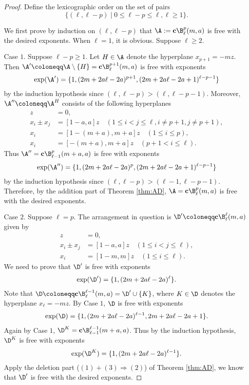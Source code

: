  \begin{proof}
Define the lexicographic order on the set of pairs
$$\{ (\ell, \ell-p) \mid 0\le \ell- p \le \ell, \ell \ge 1\}.$$

We first prove by induction on $ (\ell, \ell-p) $ that $\A: = \textbf{c}\B^p_\ell(m, a)$ is free with the desired exponents. 
When $\ell=1$, it is obvious. Suppose $\ell\ge2$.

Case $1$. Suppose $\ell-p\ge 1$. 
Let $H \in \A$ denote the hyperplane $x_{p+1} = -mz$. 
Then $\A' \coloneqq \A\setminus \{H\} = \textbf{c}\B^{p+1}_\ell(m,a)$ is free  with exponents 
$$\exp(\A') = \{1, (2m+2a\ell-2a)^{p+1}, (2m+2a\ell-2a+1)^{\ell-p-1}\}$$ 
by the induction hypothesis since $(\ell, \ell-p) > (\ell, \ell-p-1)$. 
Moreover, $\A'' \coloneqq \A^{H}$ consists of the following hyperplanes 
\begin{align*}
z &= 0 , \\
x_{i}\pm x_{j} &=  [1-a , a]z\quad  (1 \leq i < j \leq \ell, i\ne p+1,j\ne p+1 ), \\
x_i&=  [1-(m+a) , m+a]z \quad (1 \leq   i \leq p), \\
x_i&=[-(m+a) , m+a] z \quad (p+1<  i \leq \ell).
\end{align*}
Thus $\A'' =   \textbf{c}\B^{p}_{\ell-1}(m+a, a) $ is free with exponents 
$$\exp(\A'') = \{1, (2m+2a\ell-2a)^{p}, (2m+2a\ell-2a+1)^{\ell-p-1}\}$$ 
by the induction hypothesis since $(\ell, \ell-p) > (\ell-1, \ell-p-1)$. 
Therefore, by the addition part of Theorem \ref{thm:AD}, $\A =\textbf{c}\B^p_\ell(m, a)$ is free with the desired exponents. 

Case $2$. Suppose  $\ell=p$. 
The arrangement  in question is $\D'  \coloneqq \textbf{c}\B^\ell_\ell(m,a)$ given by
\begin{align*}
z &= 0 , \\
x_{i}\pm x_{j} &=  [1-a , a]z\quad  (1 \leq i < j \leq \ell), \\
x_i&=  [1-m , m]z \quad (1 \leq   i \leq \ell).
\end{align*}
We need to prove   that $\D'$ is free with exponents 
$$\exp(\D') = \{1, (2m+2a\ell-2a)^{\ell}\}.$$ 
Note that $\D  \coloneqq \textbf{c}\B^{\ell-1}_\ell(m,a) = \D' \cup \{K\}$, where $K  \in \D$ denotes the hyperplane $x_\ell = -mz$. 
By Case $1$, $\D$ is free with exponents 
$$\exp(\D) = \{1, (2m+2a\ell-2a)^{\ell-1}, 2m+2a\ell-2a+1\}.$$
Again by Case $1$, $\D^K= \textbf{c}\B^{\ell-1}_{\ell-1}(m+a, a)$.
Thus by the induction hypothesis, $\D^K$ is free with exponents 
$$\exp(\D^K) = \{1, (2m+2a\ell-2a)^{\ell-1}\}.$$ 
Apply the deletion part ($(1)+(3) \Rightarrow (2)$) of Theorem \ref{thm:AD}, we know that  
$\D'$ is free with the desired exponents. 


\end{proof}
